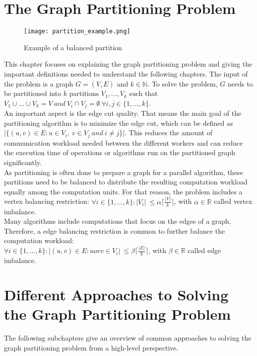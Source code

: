 \documentclass[acmsmall,nonacm,screen,review]{acmart}
\begin{document}
\section{The Graph Partitioning Problem}
\begin{figure}[t]
\centering
\caption{Example of a balanced partition}
\label{partition}
\texttt{[image: partition\_example.png]}
\end{figure}
This chapter focuses on explaining the graph partitioning problem and giving the important definitions needed to understand the following chapters. The input of the problem is a graph $G = (V,E)$ and $k\in \mathbb{N}$. To solve the problem, $G$ needs to be partitioned into $k$ partitions $V_{1},...,V_{k}$ such that $V_{1}\cup...\cup V_{k} = V\ and\ V_{i}\cap V_{j} = \emptyset\ \forall i,j\in \{1,...,k\}$.\\
An important aspect is the edge cut quality. That means the main goal of the partitioning algorithm is to minimize the edge cut, which can be defined as $\vert \{(u,v)\in E : u\in V_{i},\ v\in V_{j}\ and\ i\neq j \}\vert$. This reduces the amount of communication workload needed between the different workers and can reduce the execution time of operations or algorithms run on the partitioned graph significantly. \\
As partitioning is often done to prepare a graph for a parallel algorithm, these partitions need to be balanced to distribute the resulting computation workload equally among the computation units. For that reason, the problem includes a vertex balancing restriction: $\forall i\in \{1,...,k\} : \vert V_{i}\vert \ \leq \alpha \lceil \frac{\vert V \vert }{k} \rceil $, with $\alpha \in \mathbb{R}$ called vertex imbalance. \\
Many algorithms include computations that focus on the edges of a graph. Therefore, a edge balancing restriction is common to further balance the computation workload: \\ $\forall i\in \{1,...,k\} : \vert (u,v)\in E : u or v \in V_{i} \vert \ \leq \beta \lceil \frac{\vert E \vert }{k} \rceil $, with $\beta \in \mathbb{R}$ called edge imbalance.
\section{Different Approaches to Solving the Graph Partitioning Problem}
The following subchapters give an overview of common approaches to solving the graph partitioning problem from a high-level perspective.
\end{document}
